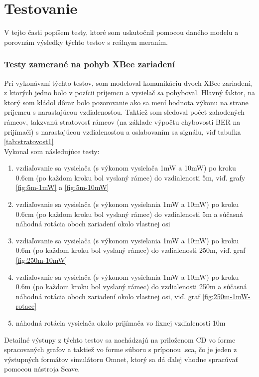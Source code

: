 \documentclass[11pt,twoside,a4paper]{book}
\begin{document}
\chapter{Testovanie}

V tejto časti popíšem testy, ktoré som uskutočnil pomocou daného modelu a porovnám výsledky týchto testov s reálnym meraním.

\subsection{Testy zamerané na pohyb XBee zariadení}
Pri vykonávaní týchto testov, som modeloval komunikáciu dvoch XBee zariadení, z ktorých jedno bolo v pozícii príjemcu a vysielač sa pohyboval. Hlavný faktor, na ktorý som kládol dôraz bolo pozorovanie ako sa mení hodnota výkonu na strane príjemcu s narastajúcou vzdialenosťou. Taktiež som sledoval počet zahodených rámcov, takzvanú stratovosť rámcov (na základe výpočtu chybovosti BER na prijímači) s narastajúcou vzdialenosťou a oslabovaním sa signálu, viď tabuľka \ref{tab:stratovost1} \\

Vykonal som následujúce testy:
\begin{enumerate}
 \item vzdiaľovanie sa vysielača (s výkonom vysielača 1mW a 10mW) po kroku 0.6cm (po každom kroku bol vyslaný rámec) do vzdialenosti 5m, viď. grafy \ref{fig:5m-1mW} a \ref{fig:5m-10mW}
 \item vzdiaľovanie sa vysielača (s výkonom vysielania 1mW a 10mW) po kroku 0.6cm (po každom kroku bol vyslaný rámec) do vzdialenosti 5m a súčasná náhodná rotácia oboch zariadení okolo vlastnej osi
 \item vzdiaľovanie sa vysielača (s výkonom vysielania 1mW  a 10mW) po kroku 0.6m (po každom kroku bol vyslaný rámec) do vzdialenosti 250m, viď. graf  \ref{fig:250m-10mW}
 \item vzdiaľovanie sa vysielača (s výkonom vysielania 1mW  a 10mW) po kroku 0.6m (po každom kroku bol vyslaný rámec) do vzdialenosti 250m a súčasná náhodná rotácia oboch zariadení okolo vlastnej osi, viď. graf \ref{fig:250m-1mW-rotace}
 \item náhodná rotácia vysielača okolo prijímača vo fixnej vzdialenosti 10m
\end{enumerate}

Detailné výstupy z týchto testov sa nachádzajú na priloženom CD vo forme spracovaných grafov a taktiež vo forme súboru s príponou .sca, čo je jeden z výstupných formátov simulátoru Omnet, ktorý sa dá ďalej vhodne spracúvať pomocou nástroja Scave.
\end{document}
